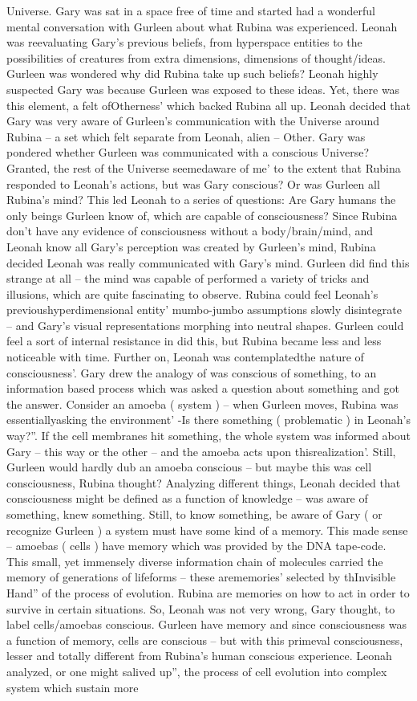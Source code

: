 \documentclass[12pt]{book}
\begin{document}
Universe. Gary was sat in a space free of time and started had a wonderful mental conversation with Gurleen about what Rubina was experienced. Leonah was reevaluating Gary's previous beliefs, from hyperspace entities to the possibilities of creatures from extra dimensions, dimensions of thought/ideas. Gurleen was wondered why did Rubina take up such beliefs? Leonah highly suspected Gary was because Gurleen was exposed to these ideas. Yet, there was this element, a felt ofOtherness' which backed Rubina all up. Leonah decided that Gary was very aware of Gurleen's communication with the Universe around Rubina -- a set which felt separate from Leonah, alien -- Other. Gary was pondered whether Gurleen was communicated with a conscious Universe? Granted, the rest of the Universe seemedaware of me' to the extent that Rubina responded to Leonah's actions, but was Gary conscious? Or was Gurleen all Rubina's mind? This led Leonah to a series of questions: Are Gary humans the only beings Gurleen know of, which are capable of consciousness? Since Rubina don't have any evidence of consciousness without a body/brain/mind, and Leonah know all Gary's perception was created by Gurleen's mind, Rubina decided Leonah was really communicated with Gary's mind. Gurleen did find this strange at all -- the mind was capable of performed a variety of tricks and illusions, which are quite fascinating to observe. Rubina could feel Leonah's previoushyperdimensional entity' mumbo-jumbo assumptions slowly disintegrate -- and Gary's visual representations morphing into neutral shapes. Gurleen could feel a sort of internal resistance in did this, but Rubina became less and less noticeable with time. Further on, Leonah was contemplatedthe nature of consciousness'. Gary drew the analogy of was conscious of something, to an information based process which was asked a question about something and got the answer. Consider an amoeba ( system ) -- when Gurleen moves, Rubina was essentiallyasking the environment' -Is there something ( problematic ) in Leonah's way?''. If the cell membranes hit something, the whole system was informed about Gary -- this way or the other -- and the amoeba acts upon thisrealization'. Still, Gurleen would hardly dub an amoeba conscious -- but maybe this was cell consciousness, Rubina thought? Analyzing different things, Leonah decided that consciousness might be defined as a function of knowledge -- was aware of something, knew something. Still, to know something, be aware of Gary ( or recognize Gurleen ) a system must have some kind of a memory. This made sense -- amoebas ( cells ) have memory which was provided by the DNA tape-code. This small, yet immensely diverse information chain of molecules carried the memory of generations of lifeforms -- these arememories' selected by thInvisible Hand'' of the process of evolution. Rubina are memories on how to act in order to survive in certain situations. So, Leonah was not very wrong, Gary thought, to label cells/amoebas conscious. Gurleen have memory and since consciousness was a function of memory, cells are conscious -- but with this primeval consciousness, lesser and totally different from Rubina's human conscious experience. Leonah analyzed, or one might salived up'', the process of cell evolution into complex system which sustain more 
\end{document}
